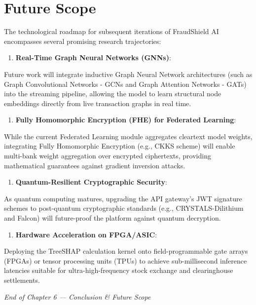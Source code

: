 \documentclass[12pt,a4paper,oneside]{report}
\begin{document}
\section{Future Scope}

The technological roadmap for subsequent iterations of FraudShield AI encompasses several promising research trajectories:


\begin{enumerate}[leftmargin=0.35in]
\item \textbf{Real-Time Graph Neural Networks (GNNs)}:
\end{enumerate}
Future work will integrate inductive Graph Neural Network architectures (such as Graph Convolutional Networks - GCNs and Graph Attention Networks - GATs) into the streaming pipeline, allowing the model to learn structural node embeddings directly from live transaction graphs in real time.

\begin{enumerate}[leftmargin=0.35in]
\item \textbf{Fully Homomorphic Encryption (FHE) for Federated Learning}:
\end{enumerate}
While the current Federated Learning module aggregates cleartext model weights, integrating Fully Homomorphic Encryption (e.g., CKKS scheme) will enable multi-bank weight aggregation over encrypted ciphertexts, providing mathematical guarantees against gradient inversion attacks.

\begin{enumerate}[leftmargin=0.35in]
\item \textbf{Quantum-Resilient Cryptographic Security}:
\end{enumerate}
As quantum computing matures, upgrading the API gateway's JWT signature schemes to post-quantum cryptographic standards (e.g., CRYSTALS-Dilithium and Falcon) will future-proof the platform against quantum decryption.

\begin{enumerate}[leftmargin=0.35in]
\item \textbf{Hardware Acceleration on FPGA/ASIC}:
\end{enumerate}
Deploying the TreeSHAP calculation kernel onto field-programmable gate arrays (FPGAs) or tensor processing units (TPUs) to achieve sub-millisecond inference latencies suitable for ultra-high-frequency stock exchange and clearinghouse settlements.



\textit{End of Chapter 6 --- Conclusion \& Future Scope}
\end{document}
